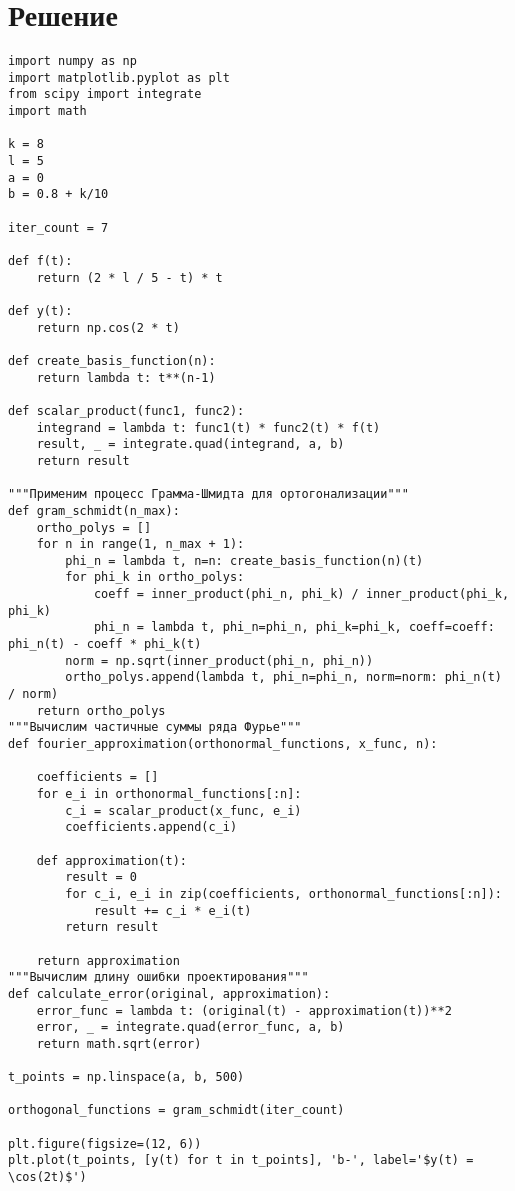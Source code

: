 \documentclass{article}
\begin{document}
\section{Решение}
\begin{verbatim}
import numpy as np
import matplotlib.pyplot as plt
from scipy import integrate
import math

k = 8
l = 5
a = 0
b = 0.8 + k/10

iter_count = 7

def f(t):
    return (2 * l / 5 - t) * t

def y(t):
    return np.cos(2 * t)

def create_basis_function(n):
    return lambda t: t**(n-1)

def scalar_product(func1, func2):
    integrand = lambda t: func1(t) * func2(t) * f(t)
    result, _ = integrate.quad(integrand, a, b)
    return result

"""Применим процесс Грамма-Шмидта для ортогонализации"""
def gram_schmidt(n_max):
    ortho_polys = []
    for n in range(1, n_max + 1):
        phi_n = lambda t, n=n: create_basis_function(n)(t)
        for phi_k in ortho_polys:
            coeff = inner_product(phi_n, phi_k) / inner_product(phi_k, phi_k)
            phi_n = lambda t, phi_n=phi_n, phi_k=phi_k, coeff=coeff: phi_n(t) - coeff * phi_k(t)
        norm = np.sqrt(inner_product(phi_n, phi_n))
        ortho_polys.append(lambda t, phi_n=phi_n, norm=norm: phi_n(t) / norm)
    return ortho_polys
"""Вычислим частичные суммы ряда Фурье"""
def fourier_approximation(orthonormal_functions, x_func, n):

    coefficients = []
    for e_i in orthonormal_functions[:n]:
        c_i = scalar_product(x_func, e_i)
        coefficients.append(c_i)
    
    def approximation(t):
        result = 0
        for c_i, e_i in zip(coefficients, orthonormal_functions[:n]):
            result += c_i * e_i(t)
        return result
    
    return approximation
"""Вычислим длину ошибки проектирования"""
def calculate_error(original, approximation):
    error_func = lambda t: (original(t) - approximation(t))**2
    error, _ = integrate.quad(error_func, a, b)
    return math.sqrt(error)

t_points = np.linspace(a, b, 500)

orthogonal_functions = gram_schmidt(iter_count)

plt.figure(figsize=(12, 6))
plt.plot(t_points, [y(t) for t in t_points], 'b-', label='$y(t) = \cos(2t)$')


\end{verbatim}
\end{document}
